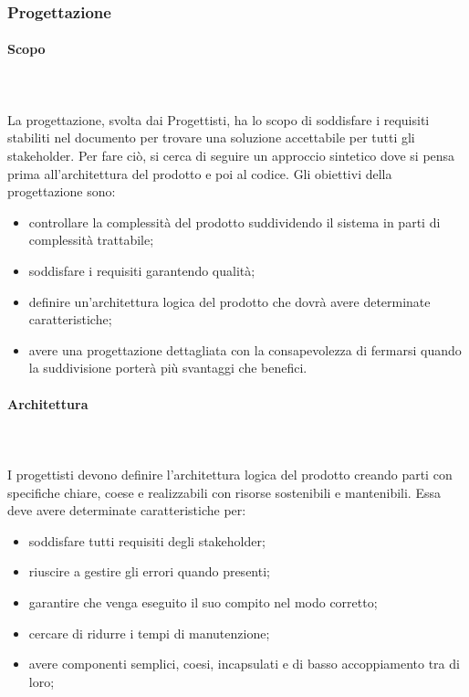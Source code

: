 \subsubsection{Progettazione}
\paragraph{Scopo}\mbox{}\\ \\
La progettazione, svolta dai Progettisti, ha lo scopo di soddisfare i requisiti stabiliti nel documento \AdR{} per trovare una soluzione accettabile per tutti gli stakeholder.
Per fare ciò, si cerca di seguire un approccio sintetico dove si pensa prima all’architettura del prodotto e poi al codice.
Gli obiettivi della progettazione sono:
\begin{itemize}
	\item controllare la complessità del prodotto suddividendo il sistema in parti di complessità trattabile;
	\item soddisfare i requisiti garantendo qualità;
	\item definire un’architettura logica del prodotto che dovrà avere determinate caratteristiche;
	\item avere una progettazione dettagliata con la consapevolezza di fermarsi quando la suddivisione porterà più svantaggi che benefici.
\end{itemize}

\paragraph{Architettura}\mbox{}\\ \\
I progettisti devono definire l’architettura logica del prodotto creando parti con specifiche chiare, coese e realizzabili con risorse sostenibili e mantenibili. Essa deve avere determinate caratteristiche per:
\begin{itemize}
	\item soddisfare tutti requisiti degli stakeholder;
	\item riuscire a gestire gli errori quando presenti;
	\item garantire che venga eseguito il suo compito nel modo corretto;
	\item cercare di ridurre i tempi di manutenzione;
	\item avere componenti semplici, coesi, incapsulati e di basso accoppiamento tra di loro;
\end{itemize}


